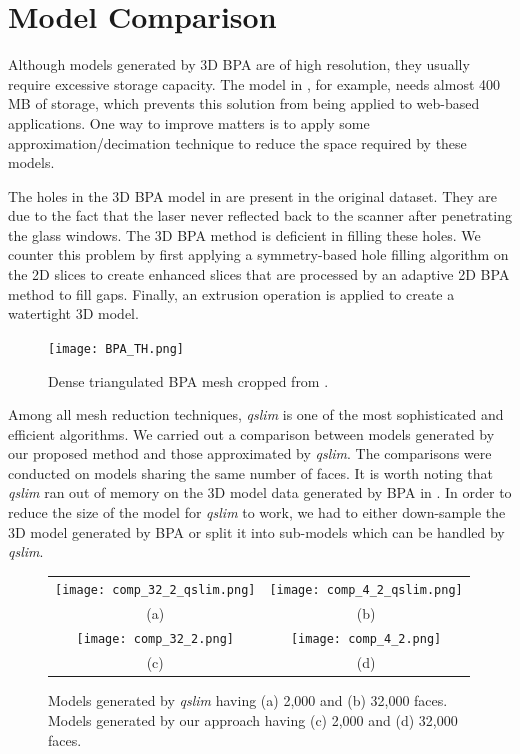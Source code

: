 \section{Model Comparison}

Although models generated by 3D BPA are of high resolution, they usually
require excessive storage capacity.
The model in , for example, needs almost 400 MB of storage,
which prevents this solution from being applied to web-based applications.
One way to improve matters is to apply some approximation/decimation
technique to reduce the space required by these models.

The holes in the 3D BPA model in  are present in the
original dataset.
They are due to the fact that the laser never reflected back to
the scanner after penetrating the glass windows.
The 3D BPA method is deficient in filling these holes.
We counter this problem by first applying a symmetry-based hole filling
algorithm on the 2D slices to create enhanced slices that are processed
by an adaptive 2D BPA method to fill gaps.
Finally, an extrusion operation is applied to create a watertight 3D model.

\begin{figure}[htbp]
\begin{center}
\texttt{[image: BPA\_TH.png]}
\end{center}
\caption{Dense triangulated BPA mesh cropped from .}
\label{fig:TH_BPA}
\end{figure}

Among all mesh reduction techniques, {\it qslim} is one of the most
sophisticated and efficient algorithms.
We carried out a comparison between models generated by our proposed
method and those approximated by {\it qslim}.
The comparisons were conducted on models sharing the same number of faces.
It is worth noting that {\it qslim} ran out of memory on the 3D model data
generated by BPA in .
In order to reduce the size of the model for {\it qslim} to work, we had
to either down-sample the 3D model generated by BPA or split it into
sub-models which can be handled by {\it qslim}.

\begin{figure}[htbp]
\begin{center}
\begin{tabular}{cc}
\texttt{[image: comp\_32\_2\_qslim.png]} &
\texttt{[image: comp\_4\_2\_qslim.png]} \\
(a) & (b) \\
\texttt{[image: comp\_32\_2.png]} &
\texttt{[image: comp\_4\_2.png]} \\
(c) & (d)
\end{tabular}
\end{center}
\caption{
Models generated by {\it qslim} having (a) 2,000 and (b) 32,000 faces.
Models generated by our approach having (c) 2,000 and (d) 32,000 faces.}
\label{fig:TH_comp}
\end{figure}

